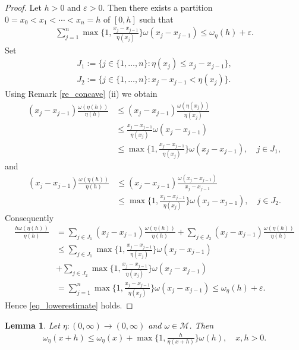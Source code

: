 \documentclass[10pt,a4paper]{amsart}
\newtheorem{lemma}[theorem]{Lemma}
\theoremstyle{definition}
\newcommand{\M}{\mathcal{M}}
\begin{document}
\begin{proof}
Let $ h>0 $ and $ \varepsilon>0 $. Then there exists a partition $ 0=x_0<x_1<\cdots<x_n=h $ of $ [0,h] $ such that
\begin{align*}
\sum_{j=1}^{n}\max\bigg\lbrace 1,\frac{x_j-x_{j-1}}{\eta(x_j)}\bigg\rbrace\omega(x_j-x_{j-1})\leq\omega_{\eta}(h)+\varepsilon.
\end{align*}
Set
\begin{align*}
J_1:=\lbrace j\in\lbrace 1,\dots,n\rbrace:\eta(x_j)\leq x_j-x_{j-1}\rbrace,\\
J_2:=\lbrace j\in\lbrace 1,\dots,n\rbrace:x_j-x_{j-1}<\eta(x_j)\rbrace.
\end{align*}
Using Remark \ref{re_concave} (ii) we obtain
\begin{align*}
(x_j-x_{j-1})\frac{\omega(\eta(h))}{\eta(h)}&\leq(x_j-x_{j-1})\frac{\omega(\eta(x_j))}{\eta(x_j)}\\
&\leq\frac{x_j-x_{j-1}}{\eta(x_j)}\omega(x_j-x_{j-1})\\
&\leq\max\bigg\lbrace 1,\frac{x_j-x_{j-1}}{\eta(x_j)}\bigg\rbrace\omega(x_j-x_{j-1}),\quad j\in J_1,
\end{align*}
and 
\begin{align*}
(x_j-x_{j-1})\frac{\omega(\eta(h))}{\eta(h)}&\leq(x_j-x_{j-1})\frac{\omega(x_j-x_{j-1})}{x_j-x_{j-1}}\\
&\leq\max\bigg\lbrace 1,\frac{x_j-x_{j-1}}{\eta(x_j)}\bigg\rbrace\omega(x_j-x_{j-1}),\quad j\in J_2.
\end{align*}
Consequently
\begin{align*}
\frac{h\omega(\eta(h))}{\eta(h)}&=\sum_{j\in J_1}(x_j-x_{j-1})\frac{\omega(\eta(h))}{\eta(h)}+\sum_{j\in J_2}(x_j-x_{j-1})\frac{\omega(\eta(h))}{\eta(h)}\\
&\leq\sum_{j\in J_1}\max\bigg\lbrace 1,\frac{x_j-x_{j-1}}{\eta(x_j)}\bigg\rbrace\omega(x_j-x_{j-1})\\
&+\sum_{j\in J_2}\max\bigg\lbrace 1,\frac{x_j-x_{j-1}}{\eta(x_j)}\bigg\rbrace\omega(x_j-x_{j-1})\\
&=\sum_{j=1}^{n}\max\bigg\lbrace 1,\frac{x_j-x_{j-1}}{\eta(x_j)}\bigg\rbrace\omega(x_j-x_{j-1})\leq\omega_{\eta}(h)+\varepsilon.
\end{align*}
Hence \eqref{eq_lowerestimate} holds.
\end{proof}

\begin{lemma}\label{le_est}
Let $ \eta:(0,\infty)\to(0,\infty) $ and $ \omega\in\M $. Then
\begin{align}\label{eq_est}
\omega_{\eta}(x+h)\leq\omega_{\eta}(x)+\max\bigg\lbrace 1,\frac{h}{\eta(x+h)}\bigg\rbrace\omega(h),\quad x,h>0.
\end{align}
\end{lemma}
\end{document}
